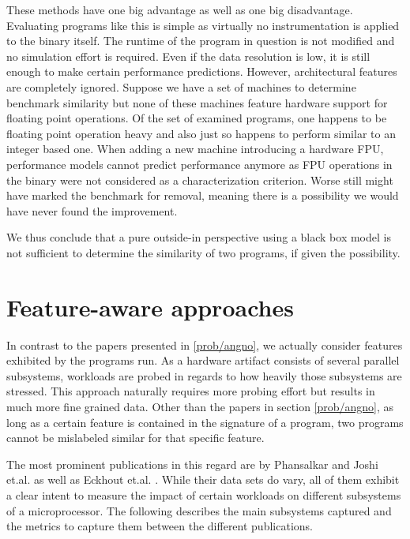 \documentclass[../bachelor_paper.tex]{subfiles}
\begin{document}
These methods have one big advantage as well as one big disadvantage. Evaluating programs like this is simple as virtually no instrumentation is applied to the binary itself. The runtime of the program in question is not modified and no simulation effort is required. Even if the data resolution is low, it is still enough to make certain performance predictions. However, architectural features are completely ignored. Suppose we have a set of machines to determine benchmark similarity but none of these machines feature hardware support for floating point operations. Of the set of examined programs, one happens to be floating point operation heavy and also just so happens to perform similar to an integer based one. When adding a new machine introducing a hardware \ac{FPU}, performance models cannot predict performance anymore as \ac{FPU} operations in the binary were not considered as a characterization criterion. Worse still \cite{vandierendonckManyBenchmarksStress} might have marked the benchmark for removal, meaning there is a possibility we would have never found the improvement.

We thus conclude that a pure outside-in perspective using a black box model is not sufficient to determine the similarity of two programs, if given the possibility.

\section{Feature-aware approaches}
In contrast to the papers presented in \ref{prob/angno}, we actually consider features exhibited by the programs run. As a hardware artifact consists of several parallel subsystems, workloads are probed in regards to how heavily those subsystems are stressed. This approach naturally requires more probing effort but results in much more fine grained data. Other than the papers in section \ref{prob/angno}, as long as a certain feature is contained in the signature of a program, two programs cannot be mislabeled similar for that specific feature.

The most prominent publications in this regard are by Phansalkar and Joshi et.al. \cite{phansalkarMeasuringProgramSimilarity2005,joshiMeasuringBenchmarkSimilarity2006} as well as Eckhout et.al. \cite{eeckhoutQuantifyingImpactInput}. While their data sets do vary, all of them exhibit a clear intent to measure the impact of certain workloads on different subsystems of a microprocessor. The following describes the main subsystems captured and the metrics to capture them between the different publications.
\end{document}
